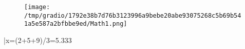 \documentclass{article}
\begin{document}
\begin{figure}[h!]
    \centering
    \texttt{[image: /tmp/gradio/1792e38b7d76b3123996a9bebe20abe93075268c5b69b541a5e587a2bfbbe9ed/Math1.png]}
\end{figure}

\bar{x}=(2+5+9)/3=5.333
\end{document}
